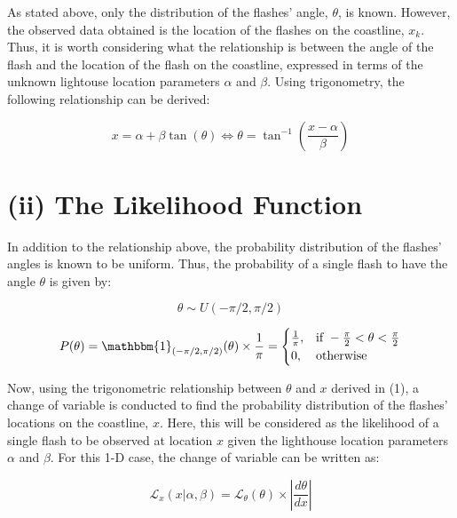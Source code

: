 \documentclass[12pt]{report} %
\begin{document}
As stated above, only the distribution of the flashes' angle, $\theta$, is known. However, the observed data obtained is the location of the flashes on the coastline, $x_{k}$. Thus, it is worth considering what the relationship is between the angle of the flash and the location of the flash on the coastline, expressed in terms of the unknown lightouse location parameters $\alpha$ and $\beta$. Using trigonometry, the following relationship can be derived:

\begin{equation}
    x = \alpha + \beta \tan(\theta) \iff \theta = \tan^{-1}\left(\frac{x - \alpha}{\beta}\right)
\end{equation}

\chapter{(ii) The Likelihood Function}

In addition to the relationship above, the probability distribution of the flashes' angles is known to be uniform. Thus, the probability of a single flash to have the angle $\theta$ is given by\cite[p.79]{FJames2006}:

\begin{equation}
    \theta \sim U(-\pi/2, \pi/2)
\end{equation}

\begin{equation}
    P(\theta) = \mathbbm{1}_{(-\pi/2, \pi/2)}(\theta) \times \frac{1}{\pi} = \begin{cases} \frac{1}{\pi}, & \text{if } -\frac{\pi}{2} < \theta < \frac{\pi}{2} \\ 0, & \text{otherwise} \end{cases}
\end{equation}

Now, using the trigonometric relationship between $\theta$ and $x$ derived in (1), a change of variable is conducted to find the probability distribution of the flashes' locations on the coastline, $x$. Here, this will be considered as the likelihood of a single flash to be observed at location $x$ given the lighthouse location parameters $\alpha$ and $\beta$. For this 1-D case, the change of variable can be written as\cite[p.20]{FJames2006}:

\begin{equation}
    \mathcal{L}_{x}(x|\alpha, \beta) = \mathcal{L}_{\theta}(\theta) \times \left| \frac{d\theta}{dx} \right|
\end{equation}
\end{document}
